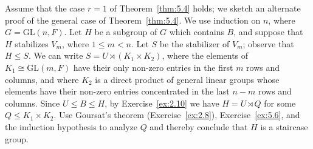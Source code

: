 \documentclass[../Odyssey_Project.tex]{subfiles}
\begin{document}
\begin{exercise}
\label{ex:5.8}
Assume that the case $r = 1$ of Theorem~\ref{thm:5.4} holds; we sketch an alternate proof of the general case of Theorem~\ref{thm:5.4}. We use induction on $n$, where $G = \mathrm{GL}(n, F)$. Let $H$ be a subgroup of $G$ which contains $B$, and suppose that $H$ stabilizes $V_m$, where $1 \leq m < n$. Let $S$ be the stabilizer of $V_m$; observe that $H \leq S$. We can write $S = U \rtimes (K_1 \times K_2)$, where the elements of $K_1 \cong \mathrm{GL}(m, F)$ have their only non-zero entries in the first $m$ rows and columns, and where $K_2$ is a direct product of general linear groups whose elements have their non-zero entries concentrated in the last $n - m$ rows and columns. Since $U \leq B \leq H$, by Exercise~\ref{ex:2.10} we have $H = U \rtimes Q$ for some $Q \leq K_1 \times K_2$. Use Goursat's theorem (Exercise~\ref{ex:2.8}), Exercise~\ref{ex:5.6}, and the induction hypothesis to analyze $Q$ and thereby conclude that $H$ is a staircase group.
\end{exercise}
\end{document}
